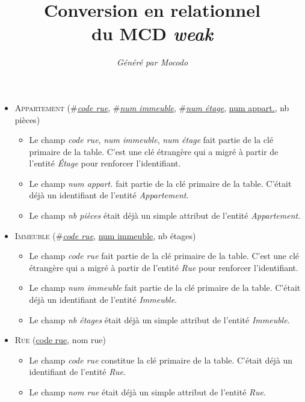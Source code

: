 \documentclass[a4paper]{article}
\title{Conversion en relationnel\\du MCD \emph{weak}}
\author{\emph{Généré par Mocodo}}
\newcommand{\relat}[1]{\textsc{#1}}
\newcommand{\attr}[1]{#1}
\newcommand{\prim}[1]{\uline{#1}}
\newcommand{\foreign}[1]{\#\textsl{#1}}
\begin{document}
\maketitle

\begin{itemize}
  \item \relat{Appartement} (\foreign{\prim{code rue}}, \foreign{\prim{num immeuble}}, \foreign{\prim{num étage}}, \prim{num appart.}, \attr{nb pièces})
  \begin{itemize}
    \item Le champ \emph{code rue}, \emph{num immeuble}, \emph{num étage} fait partie de la clé primaire de la table. C'est une clé étrangère qui a migré à partir de l'entité \emph{Étage} pour renforcer l'identifiant.
    \item Le champ \emph{num appart.} fait partie de la clé primaire de la table. C'était déjà un identifiant de l'entité \emph{Appartement}.
    \item Le champ \emph{nb pièces} était déjà un simple attribut de l'entité \emph{Appartement}.
  \end{itemize}

  \item \relat{Immeuble} (\foreign{\prim{code rue}}, \prim{num immeuble}, \attr{nb étages})
  \begin{itemize}
    \item Le champ \emph{code rue} fait partie de la clé primaire de la table. C'est une clé étrangère qui a migré à partir de l'entité \emph{Rue} pour renforcer l'identifiant.
    \item Le champ \emph{num immeuble} fait partie de la clé primaire de la table. C'était déjà un identifiant de l'entité \emph{Immeuble}.
    \item Le champ \emph{nb étages} était déjà un simple attribut de l'entité \emph{Immeuble}.
  \end{itemize}

  \item \relat{Rue} (\prim{code rue}, \attr{nom rue})
  \begin{itemize}
    \item Le champ \emph{code rue} constitue la clé primaire de la table. C'était déjà un identifiant de l'entité \emph{Rue}.
    \item Le champ \emph{nom rue} était déjà un simple attribut de l'entité \emph{Rue}.
  \end{itemize}


\end{itemize}
\end{document}
